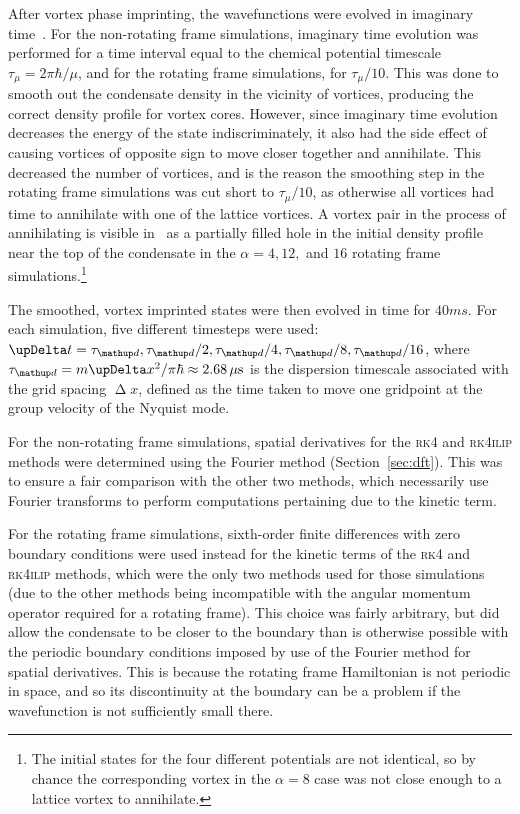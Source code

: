 After vortex phase imprinting, the wavefunctions were evolved in imaginary time~\cite{chiofalo2000}. For the non-rotating frame simulations, imaginary time evolution was performed for a time interval equal to the chemical potential timescale $\tau_\mu= 2\pi\hbar/\mu$, and for the rotating frame simulations, for $\tau_\mu/10$. This was done to smooth out the condensate density in the vicinity of vortices, producing the correct density profile for vortex cores. However, since imaginary time evolution decreases the energy of the state indiscriminately, it also had the side effect of causing vortices of opposite sign to move closer together and annihilate. This decreased the number of vortices, and is the reason the smoothing step in the rotating frame simulations was cut short to $\tau_\mu/10$, as otherwise all vortices had time to annihilate with one of the lattice vortices. A vortex pair in the process of annihilating is visible in~ as a partially filled hole in the initial density profile near the top of the condensate in the $\alpha=4, 12,$ and $16$ rotating frame simulations.\footnote{The initial states for the four different potentials are not identical, so by chance the corresponding vortex in the $\alpha=8$ case was not close enough to a lattice vortex to annihilate.}

The smoothed, vortex imprinted states were then evolved in time for $40\unit{ms}$. For each simulation, five different timesteps were used: $\upDelta t = \tau_\up d, \tau_\up d / 2, \tau_\up d / 4, \tau_\up d / 8, \tau_\up d / 16$, where \mbox{$\tau_\up d = m \upDelta x^2 / \pi\hbar \approx 2.68\unit{\mu s}$} is the dispersion timescale associated with the grid spacing $\upDelta x$, defined as the time taken to move one gridpoint at the group velocity of the Nyquist mode.

For the non-rotating frame simulations, spatial derivatives for the \textsc{rk4} and \textsc{rk4ilip} methods were determined using the Fourier method (Section~\ref{sec:dft}). This was to ensure a fair comparison with the other two methods, which necessarily use Fourier transforms to perform computations pertaining due to the kinetic term.

For the rotating frame simulations, sixth-order finite differences with zero boundary conditions were used instead for the kinetic terms of the \textsc{rk4} and \textsc{rk4ilip} methods, which were the only two methods used for those simulations (due to the other methods being incompatible with the angular momentum operator required for a rotating frame). This choice was fairly arbitrary, but did allow the condensate to be closer to the boundary than is otherwise possible with the periodic boundary conditions imposed by use of the Fourier method for spatial derivatives. This is because the rotating frame Hamiltonian is not periodic in space, and so its discontinuity at the boundary can be a problem if the wavefunction is not sufficiently small there.

